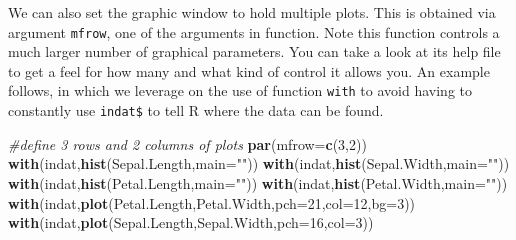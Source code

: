 \documentclass[
]{article}
\newenvironment{Shaded}{\begin{snugshade}}{\end{snugshade}}
\newcommand{\AttributeTok}[1]{\textcolor[rgb]{0.13,0.29,0.53}{#1}}
\newcommand{\CommentTok}[1]{\textcolor[rgb]{0.56,0.35,0.01}{\textit{#1}}}
\newcommand{\DecValTok}[1]{\textcolor[rgb]{0.00,0.00,0.81}{#1}}
\newcommand{\FunctionTok}[1]{\textcolor[rgb]{0.13,0.29,0.53}{\textbf{#1}}}
\newcommand{\NormalTok}[1]{#1}
\newcommand{\StringTok}[1]{\textcolor[rgb]{0.31,0.60,0.02}{#1}}
\begin{document}
\begin{Shaded}
\end{Shaded}

We can also set the graphic window to hold multiple plots. This is
obtained via argument \texttt{mfrow}, one of the arguments in function.
Note this function controls a much larger number of graphical
parameters. You can take a look at its help file to get a feel for how
many and what kind of control it allows you. An example follows, in
which we leverage on the use of function \texttt{with} to avoid having
to constantly use \texttt{indat\$} to tell R where the data can be
found.

\begin{Shaded}
\begin{Highlighting}[]
\CommentTok{\#define 3 rows and 2 columns of plots}
\FunctionTok{par}\NormalTok{(}\AttributeTok{mfrow=}\FunctionTok{c}\NormalTok{(}\DecValTok{3}\NormalTok{,}\DecValTok{2}\NormalTok{))}
\FunctionTok{with}\NormalTok{(indat,}\FunctionTok{hist}\NormalTok{(Sepal.Length,}\AttributeTok{main=}\StringTok{""}\NormalTok{))}
\FunctionTok{with}\NormalTok{(indat,}\FunctionTok{hist}\NormalTok{(Sepal.Width,}\AttributeTok{main=}\StringTok{""}\NormalTok{))}
\FunctionTok{with}\NormalTok{(indat,}\FunctionTok{hist}\NormalTok{(Petal.Length,}\AttributeTok{main=}\StringTok{""}\NormalTok{))}
\FunctionTok{with}\NormalTok{(indat,}\FunctionTok{hist}\NormalTok{(Petal.Width,}\AttributeTok{main=}\StringTok{""}\NormalTok{))}
\FunctionTok{with}\NormalTok{(indat,}\FunctionTok{plot}\NormalTok{(Petal.Length,Petal.Width,}\AttributeTok{pch=}\DecValTok{21}\NormalTok{,}\AttributeTok{col=}\DecValTok{12}\NormalTok{,}\AttributeTok{bg=}\DecValTok{3}\NormalTok{))}
\FunctionTok{with}\NormalTok{(indat,}\FunctionTok{plot}\NormalTok{(Sepal.Length,Sepal.Width,}\AttributeTok{pch=}\DecValTok{16}\NormalTok{,}\AttributeTok{col=}\DecValTok{3}\NormalTok{))}
\end{Highlighting}
\end{Shaded}
\end{document}
